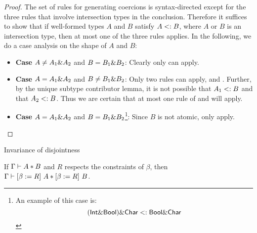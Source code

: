 \begin{proof}
The set of rules for generating coercions is syntax-directed except for the three rules that involve intersection types in the conclusion. Therefore it suffices to show that if well-formed types $A$ and $B$ satisfy $A <: B$, where $A$ or $B$ is an intersection type, then at most one of the three rules applies. In the following, we do a case analysis on the shape of $A$ and $B$:

\begin{itemize}
  \item \textbf{Case} $A \neq A_1 \& A_2$ and $B = B_1 \& B_2$: Clearly only  can apply.

  \item \textbf{Case} $A = A_1 \& A_2$ and $B \neq B_1 \& B_2$: Only two rules can apply,  and . Further, by the unique subtype contributor lemma, it is not possible that $A_1 <: B$ and that $A_2 <: B$. Thus we are certain that at most one rule of  and  will apply.

  \item \textbf{Case} $A = A_1 \& A_2$ and $B = B_1 \& B_2$\footnote{An example of this case is:
    \[ (\textsf{Int} \& \textsf{Bool}) \& \textsf{Char} <: \textsf{Bool} \& \textsf{Char} \]}: Since $B$ is not atomic, only  apply.

\end{itemize}
\end{proof}

\begin{lemma}{Invariance of disjointness}
  \label{lemma:invariance-of-disjointness}

  If $\Gamma \vdash A * B$ and $R$ respects the constraints of $\beta$, then
  $\Gamma \vdash \lbrack \beta := R \rbrack~ A * \lbrack \beta := R \rbrack~ B$.

\end{lemma}

